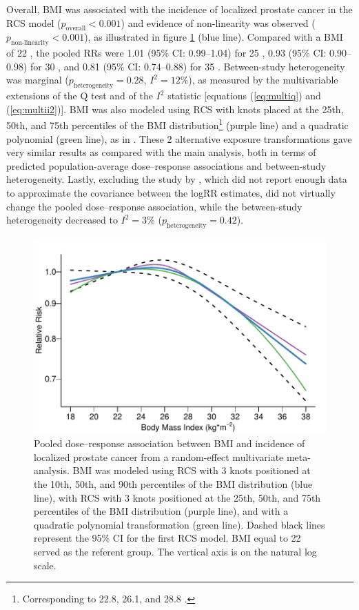 Overall, BMI was associated with the incidence of localized prostate cancer in the RCS model ($p_{\textrm{overall}}<0.001$) and evidence of non-linearity was observed ($p_{\textrm{non-linearity}}<0.001$), as illustrated in figure \ref{fig:pool_loc} (blue line). Compared with a BMI of 22 \kgmsq{}, the pooled RRs were 1.01 (95\% CI: 0.99--1.04) for 25 \kgmsq{}, 0.93 (95\% CI: 0.90--0.98) for 30 \kgmsq{}, and 0.81 (95\% CI: 0.74--0.88) for 35 \kgmsq{}. Between-study heterogeneity was marginal ($p_{\textrm{heterogeneity}}=0.28$, $I^2=12\%$), as measured by the multivariable extensions of the Q test and of the $I^2$ statistic [equations (\ref{eq:multiq}) and (\ref{eq:multii2})]. BMI was also modeled using RCS with knots placed at the 25th, 50th, and 75th percentiles of the BMI distribution\footnote{Corresponding to 22.8, 26.1, and 28.8 \kgmsq.} (purple line) and a quadratic polynomial (green line), as in . These 2 alternative exposure transformations gave very similar results as compared with the main analysis, both in terms of predicted population-average dose--response associations and between-study heterogeneity. Lastly, excluding the study by \citet{gong_obesity_2006}, which did not report enough data to approximate the covariance between the logRR estimates, did not virtually change the pooled dose--response association, while the between-study heterogeneity decreased to $I^2=3\%$ ($p_{\textrm{heterogeneity}}=0.42$).


\begin{figure}[h]
\centering
\includegraphics[width=\linewidth]{figures/pool_loc.pdf}
\caption[Pooled dose--response association between BMI and incidence of localized prostate cancer from a random-effect multivariate meta-analysis]{Pooled dose--response association between BMI and incidence of localized prostate cancer from a random-effect multivariate meta-analysis. BMI was modeled using RCS with 3 knots positioned at the 10th, 50th, and 90th percentiles of the BMI distribution (blue line), with RCS with 3 knots positioned at the 25th, 50th, and 75th percentiles of the BMI distribution (purple line), and with a quadratic polynomial transformation (green line). Dashed black lines represent the 95\% CI for the first RCS model. BMI equal to 22 \kgmsq{} served as the referent group. The vertical axis is on the natural log scale.}
\label{fig:pool_loc}
\end{figure}


